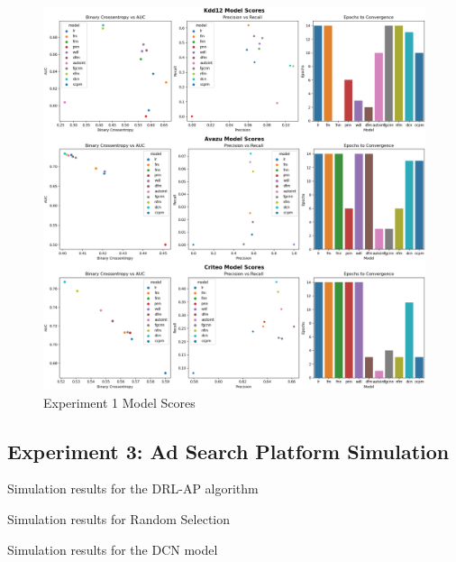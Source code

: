 \documentclass{mldsmsc}
\begin{document}
\begin{figure}[h]
    \centering
    \includegraphics[width=\textwidth]{../figures/model_scores.png}
    \caption{Experiment 1 Model Scores}
    \label{fig:experiment-1}
\end{figure}

\subsection{Experiment 3: Ad Search Platform Simulation}

\begin{table}[h]
    \caption{Simulation results for the DRL-AP algorithm}
    \label{tab:drl-ap}
\end{table}

\begin{table}[h]
    \caption{Simulation results for Random Selection}
    \label{tab:random-selection}
\end{table}

\begin{table}[h]
    \caption{Simulation results for the DCN model}
    \label{tab:dcn-model}
\end{table}



\end{document}
